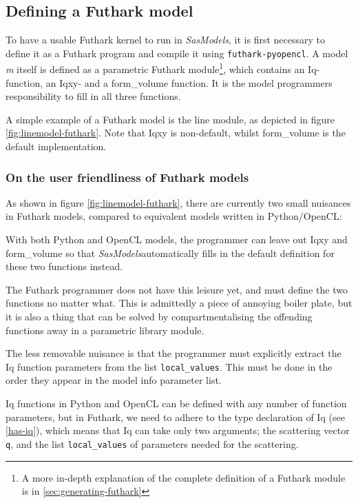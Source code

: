 \documentclass[11pt]{article}
\newcommand{\sasmodels}{\textit{SasModels}}
\begin{document}
\subsection{Defining a Futhark model}
To have a usable Futhark kernel to run in \sasmodels, it is first necessary to
define it as a Futhark program and compile it using \texttt{futhark-pyopencl}.
A model \textit{m} itself is defined as a parametric Futhark module\footnote{
  A more in-depth explanation of the complete definition of a Futhark module is 
  in \ref{sec:generating-futhark}},
which contains an Iq-function, an Iqxy- and a form\_volume function.
It is the model programmers responsibility to fill in all three functions.


A simple example of a Futhark model is the line module, 
as depicted in figure \ref{fig:linemodel-futhark}.
Note that Iqxy is non-default, whilst form\_volume is the default 
implementation.


\subsubsection{On the user friendliness of Futhark models}
As shown in figure \ref{fig:linemodel-futhark}, there are currently two small 
nuisances in Futhark models, compared to equivalent models written in
Python/OpenCL:

With both Python and OpenCL models, the programmer can leave out Iqxy and 
form\_volume so that \sasmodels automatically fills in the default definition
for these two functions instead.

The Futhark programmer does not have this leisure yet, and must define the two
functions no matter what. This is admittedly a piece of annoying boiler plate,
but it is also a thing that can be solved by compartmentalising the offending
functions away in a parametric library module.

The less removable nuisance is that the programmer must explicitly extract the
Iq function parameters from the list \texttt{local\_values}. This must be done
in the order they appear in the model info parameter list.

Iq functions in Python and OpenCL can be defined with any number of function 
parameters, but in Futhark, we need to adhere to the type declaration of Iq 
(see \ref{has-iq}), which means that Iq can take only two arguments; the 
scattering vector \texttt{q}, and the list \texttt{local\_values} of parameters
needed for the scattering.
\end{document}

